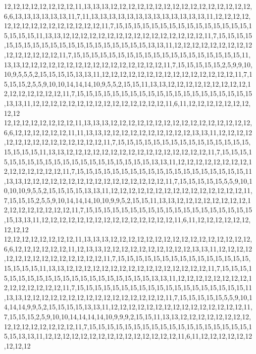 12,12,12,12,12,12,12,12,11,13,13,13,12,12,12,12,12,12,12,12,12,12,12,12,12,12,12,12,6,6,13,13,13,13,13,13,11,7,11,13,13,13,13,13,13,13,13,13,13,13,13,13,11,12,12,12,12,12,12,12,12,12,12,12,12,12,12,12,11,7,15,15,15,15,15,15,15,15,15,15,15,15,15,15,15,15,15,15,15,11,13,13,12,12,12,12,12,12,12,12,12,12,12,12,12,12,12,12,11,7,15,15,15,15,15,15,15,15,15,15,15,15,15,15,15,15,15,15,15,15,13,13,11,12,12,12,12,12,12,12,12,12,12,12,12,12,12,12,11,7,15,15,15,15,15,15,15,15,15,15,15,15,15,15,15,15,15,15,15,11,13,13,12,12,12,12,12,12,12,12,12,12,12,12,12,12,12,12,11,7,15,15,15,15,15,2,5,9,9,10,10,9,5,5,5,2,15,15,15,15,13,13,11,12,12,12,12,12,12,12,12,12,12,12,12,12,12,12,11,7,15,15,15,2,5,5,9,10,10,14,14,14,10,9,5,5,2,15,15,11,13,13,12,12,12,12,12,12,12,12,12,12,12,12,12,12,12,12,11,7,15,15,15,15,15,15,15,15,15,15,15,15,15,15,15,15,15,15,15,15,13,13,11,12,12,12,12,12,12,12,12,12,12,12,12,12,12,12,11,6,11,12,12,12,12,12,12,12,12,12
12,12,12,12,12,12,12,12,11,13,13,13,12,12,12,12,12,12,12,12,12,12,12,12,12,12,12,12,6,6,12,12,12,12,12,12,11,11,13,13,12,12,12,12,12,12,12,12,12,12,13,13,11,12,12,12,12,12,12,12,12,12,12,12,12,12,12,12,11,7,15,15,15,15,15,15,15,15,15,15,15,15,15,15,15,15,15,15,15,11,13,13,12,12,12,12,12,12,12,12,12,12,12,12,12,12,12,12,11,7,15,15,15,15,15,15,15,15,15,15,15,15,15,15,15,15,15,15,15,15,13,13,11,12,12,12,12,12,12,12,12,12,12,12,12,12,12,12,11,7,15,15,15,15,15,15,15,15,15,15,15,15,15,15,15,15,15,15,15,11,13,13,12,12,12,12,12,12,12,12,12,12,12,12,12,12,12,12,11,7,15,15,15,15,15,5,5,9,10,10,10,10,9,5,5,2,15,15,15,15,13,13,11,12,12,12,12,12,12,12,12,12,12,12,12,12,12,12,11,7,15,15,15,2,5,5,9,10,14,14,14,10,10,9,9,5,2,15,15,11,13,13,12,12,12,12,12,12,12,12,12,12,12,12,12,12,12,12,11,7,15,15,15,15,15,15,15,15,15,15,15,15,15,15,15,15,15,15,15,15,13,13,11,12,12,12,12,12,12,12,12,12,12,12,12,12,12,12,11,6,11,12,12,12,12,12,12,12,12,12
12,12,12,12,12,12,12,12,11,13,13,13,12,12,12,12,12,12,12,12,12,12,12,12,12,12,12,12,6,6,12,12,12,12,12,12,11,12,13,13,12,12,12,12,12,12,12,12,12,12,13,13,11,12,12,12,12,12,12,12,12,12,12,12,12,12,12,12,11,7,15,15,15,15,15,15,15,15,15,15,15,15,15,15,15,15,15,15,15,11,13,13,12,12,12,12,12,12,12,12,12,12,12,12,12,12,12,12,11,7,15,15,15,15,15,15,15,15,15,15,15,15,15,15,15,15,15,15,15,15,13,13,11,12,12,12,12,12,12,12,12,12,12,12,12,12,12,12,11,7,15,15,15,15,15,15,15,15,15,15,15,15,15,15,15,15,15,15,15,11,13,13,12,12,12,12,12,12,12,12,12,12,12,12,12,12,12,12,11,7,15,15,15,15,15,5,5,9,10,14,14,14,9,9,5,2,15,15,15,15,13,13,11,12,12,12,12,12,12,12,12,12,12,12,12,12,12,12,11,7,15,15,15,2,5,9,10,10,14,14,14,14,10,9,9,9,2,15,15,11,13,13,12,12,12,12,12,12,12,12,12,12,12,12,12,12,12,12,11,7,15,15,15,15,15,15,15,15,15,15,15,15,15,15,15,15,15,15,15,15,13,13,11,12,12,12,12,12,12,12,12,12,12,12,12,12,12,12,11,6,11,12,12,12,12,12,12,12,12,12
